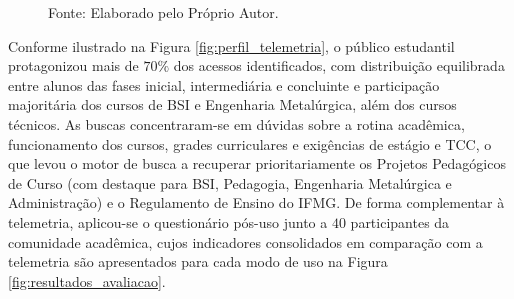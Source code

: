 \documentclass[12pt]{article}
\begin{document}
\begin{figure}[!htb]
{%
}

\vspace{0.15cm}
{\small Fonte: Elaborado pelo Próprio Autor.}
\end{figure}

Conforme ilustrado na Figura \ref{fig:perfil_telemetria}, o público estudantil protagonizou mais de $70\%$ dos acessos identificados, com distribuição equilibrada entre alunos das fases inicial, intermediária e concluinte e participação majoritária dos cursos de BSI e Engenharia Metalúrgica, além dos cursos técnicos. As buscas concentraram-se em dúvidas sobre a rotina acadêmica, funcionamento dos cursos, grades curriculares e exigências de estágio e TCC, o que levou o motor de busca a recuperar prioritariamente os Projetos Pedagógicos de Curso (com destaque para BSI, Pedagogia, Engenharia Metalúrgica e Administração) e o Regulamento de Ensino do IFMG. De forma complementar à telemetria, aplicou-se o questionário pós-uso junto a $40$ participantes da comunidade acadêmica, cujos indicadores consolidados em comparação com a telemetria são apresentados para cada modo de uso na Figura \ref{fig:resultados_avaliacao}.

\FloatBarrier
\end{document}
